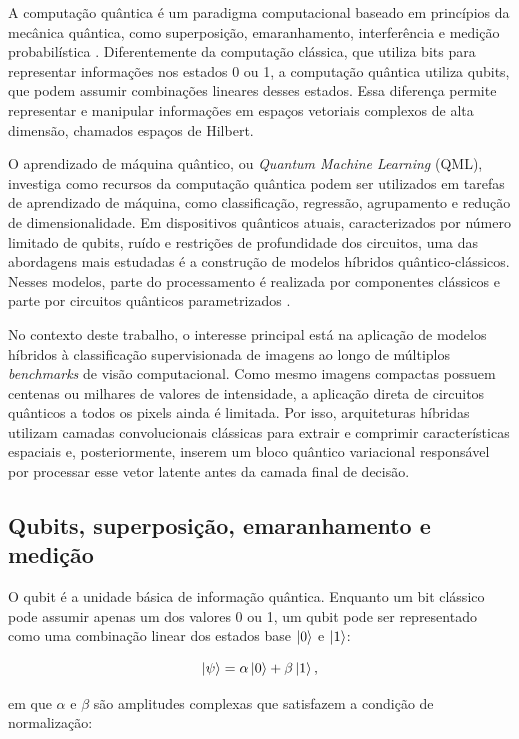 \documentclass[
    12pt,
    openright,
    oneside,
    a4paper,
    english,
    brazil
]{abntex2}
\begin{document}
A computação quântica é um paradigma computacional baseado em princípios da mecânica quântica, como superposição, emaranhamento, interferência e medição probabilística \cite{nielsen2010quantum}. Diferentemente da computação clássica, que utiliza bits para representar informações nos estados 0 ou 1, a computação quântica utiliza qubits, que podem assumir combinações lineares desses estados. Essa diferença permite representar e manipular informações em espaços vetoriais complexos de alta dimensão, chamados espaços de Hilbert.

O aprendizado de máquina quântico, ou \textit{Quantum Machine Learning} (QML), investiga como recursos da computação quântica podem ser utilizados em tarefas de aprendizado de máquina, como classificação, regressão, agrupamento e redução de dimensionalidade. Em dispositivos quânticos atuais, caracterizados por número limitado de qubits, ruído e restrições de profundidade dos circuitos, uma das abordagens mais estudadas é a construção de modelos híbridos quântico-clássicos. Nesses modelos, parte do processamento é realizada por componentes clássicos e parte por circuitos quânticos parametrizados \cite{biamonte2017qml,preskill2018nisq,cerezo2021variational}.

No contexto deste trabalho, o interesse principal está na aplicação de modelos híbridos à classificação supervisionada de imagens ao longo de múltiplos \textit{benchmarks} de visão computacional. Como mesmo imagens compactas possuem centenas ou milhares de valores de intensidade, a aplicação direta de circuitos quânticos a todos os pixels ainda é limitada. Por isso, arquiteturas híbridas utilizam camadas convolucionais clássicas para extrair e comprimir características espaciais e, posteriormente, inserem um bloco quântico variacional responsável por processar esse vetor latente antes da camada final de decisão.

\subsection{Qubits, superposição, emaranhamento e medição}

O qubit é a unidade básica de informação quântica. Enquanto um bit clássico pode assumir apenas um dos valores 0 ou 1, um qubit pode ser representado como uma combinação linear dos estados base \(\ket{0}\) e \(\ket{1}\):

\[
\ket{\psi} = \alpha\ket{0} + \beta\ket{1},
\]

em que \(\alpha\) e \(\beta\) são amplitudes complexas que satisfazem a condição de normalização:
\end{document}
